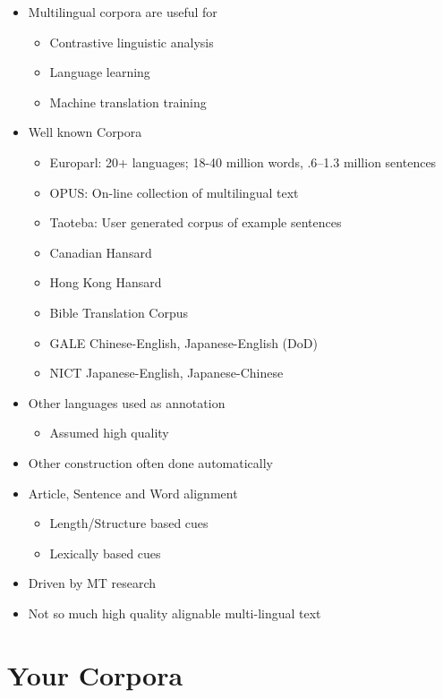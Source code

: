 \documentclass[a4paper,landscape,headrule,footrule,dvips]{foils}
\begin{document}
\begin{CJK}{UTF8}{min}
\begin{itemize}
\item Multilingual corpora are useful for
  \begin{itemize}
  \item Contrastive linguistic analysis
  \item Language learning
  \item Machine translation training
  \end{itemize}
\item Well known Corpora
  \begin{itemize}
  \item Europarl: 20+ languages;  18-40 million words, .6--1.3 million sentences
  \item OPUS:  On-line collection of multilingual text
  \item Taoteba:  User generated corpus of example sentences
  \item Canadian Hansard
  \item Hong Kong Hansard
  \item Bible Translation Corpus
  \item GALE Chinese-English, Japanese-English (DoD)
  \item NICT Japanese-English, Japanese-Chinese
  \end{itemize}
\end{itemize}

\begin{itemize}
\item Other languages used as annotation
  \begin{itemize}
  \item Assumed high quality
  \end{itemize}
\item Other construction often done automatically
\item Article, Sentence and Word alignment
  \begin{itemize}
  \item Length/Structure based cues
  \item Lexically based cues
  \end{itemize}
\item Driven by MT research
\item Not so much high quality alignable multi-lingual text
\end{itemize}

\section{Your Corpora}


\end{CJK}
\end{document}
